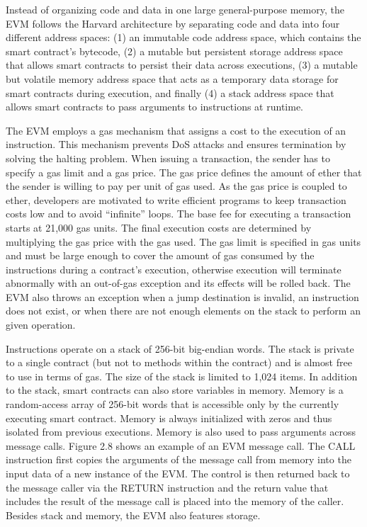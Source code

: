         Instead of organizing code and data in one large general-purpose memory, the EVM follows the Harvard architecture by separating code and data into four different address spaces: (1) an immutable code address space, which contains the smart contract's bytecode, (2) a mutable but persistent storage address space that allows smart contracts to persist their data across executions, (3) a mutable but volatile memory address space that acts as a temporary data storage for smart contracts during execution, and finally (4) a stack address space that allows smart contracts to pass arguments to instructions at runtime.

        The EVM employs a gas mechanism that assigns a cost to the execution of an instruction.
        This mechanism prevents DoS attacks and ensures termination by solving the halting problem.
        When issuing a transaction, the sender has to specify a gas limit and a gas price.
        The gas price defines the amount of ether that the sender is willing to pay per unit of gas used.
        As the gas price is coupled to ether, developers are motivated to write efficient programs to keep transaction costs low and to avoid “infinite” loops.
        The base fee for executing a transaction starts at 21,000 gas units.
        The final execution costs are determined by multiplying the gas price with the gas used.
        The gas limit is specified in gas units and must be large enough to cover the amount of gas consumed by the instructions during a contract's execution, otherwise execution will terminate abnormally with an out-of-gas exception and its effects will be rolled back.
        The EVM also throws an exception when a jump destination is invalid, an instruction does not exist, or when there are not enough elements on the stack to perform an given operation.

        Instructions operate on a stack of 256-bit big-endian words.
        The stack is private to a single contract (but not to methods within the contract) and is almost free to use in terms of gas.
        The size of the stack is limited to 1,024 items.
        In addition to the stack, smart contracts can also store variables in memory.
        Memory is a random-access array of 256-bit words that is accessible only by the currently executing smart contract.
        Memory is always initialized with zeros and thus isolated from previous executions.
        Memory is also used to pass arguments across message calls.
        Figure 2.8 shows an example of an EVM message call.
        The CALL instruction first copies the arguments of the message call from memory into the input data of a new instance of the EVM.
        The control is then returned back to the message caller via the RETURN instruction and the return value that includes the result of the message call is placed into the memory of the caller.
        Besides stack and memory, the EVM also features storage.


